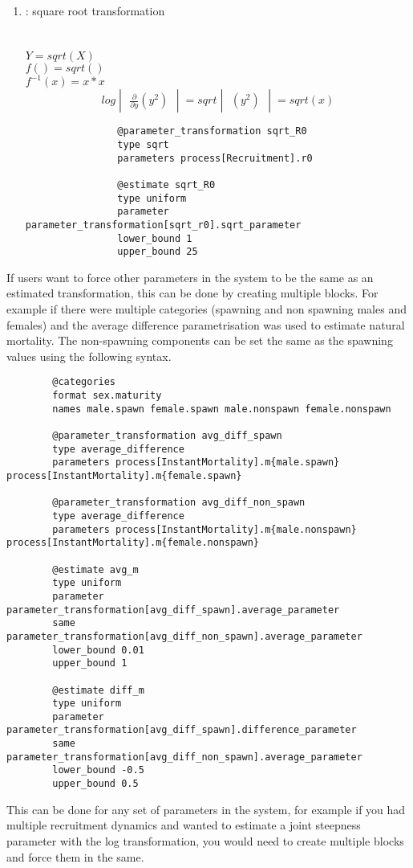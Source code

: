 \begin{enumerate}
{{\begin{verbatim}
		\end{verbatim}}}	
	\item {}  : square root transformation\\
	\\
	\\
	$Y = sqrt(X)$\\
	$f() = sqrt()$\\
	$f^{-1}(x) = x * x$
	\[
	log \begin{vmatrix} \frac{\partial}{\partial y}  (y^2) \end{vmatrix} = sqrt \begin{vmatrix}  (y^2) \end{vmatrix} = sqrt(x)
	\]
	\label{sec:Transformation-Sqrt}
	{\small{\begin{verbatim}
				@parameter_transformation sqrt_R0
				type sqrt
				parameters process[Recruitment].r0
				
				@estimate sqrt_R0
				type uniform
				parameter parameter_transformation[sqrt_r0].sqrt_parameter
				lower_bound 1
				upper_bound 25
	\end{verbatim}}}
	
	
\end{enumerate}


If users want to force other parameters in the system to be the same as an estimated transformation, this can be done by creating multiple  blocks. For example if there were multiple categories (spawning and non spawning males and females) and the average difference parametrisation was used to estimate natural mortality. The non-spawning components can be set the same as the spawning values using the following syntax.

{\small{\begin{verbatim}
		@categories
		format sex.maturity
		names male.spawn female.spawn male.nonspawn female.nonspawn
		
		@parameter_transformation avg_diff_spawn
		type average_difference
		parameters process[InstantMortality].m{male.spawn} process[InstantMortality].m{female.spawn}
		
		@parameter_transformation avg_diff_non_spawn
		type average_difference
		parameters process[InstantMortality].m{male.nonspawn} process[InstantMortality].m{female.nonspawn}
		
		@estimate avg_m
		type uniform
		parameter parameter_transformation[avg_diff_spawn].average_parameter
		same  parameter_transformation[avg_diff_non_spawn].average_parameter
		lower_bound 0.01
		upper_bound 1
		
		@estimate diff_m
		type uniform
		parameter parameter_transformation[avg_diff_spawn].difference_parameter
		same  parameter_transformation[avg_diff_non_spawn].average_parameter
		lower_bound -0.5
		upper_bound 0.5		
\end{verbatim}}}

This can be done for any set of parameters in the system, for example if you had multiple recruitment dynamics and wanted to estimate a joint steepness parameter with the log transformation, you would need to create multiple blocks and force them in the same.
